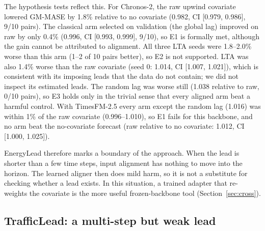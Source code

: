 \documentclass[preprint,11pt,authoryear]{elsarticle}
\newcommand{\lta}{\textsc{LTA}}
\begin{document}
The hypothesis tests reflect this. For Chronos-2, the raw upwind covariate lowered GM-MASE by 1.8\% relative to no covariate (0.982, CI [0.979, 0.986], 9/10 pairs). The classical arm selected on validation (the global lag) improved on raw by only 0.4\% (0.996, CI [0.993, 0.999], 9/10), so E1 is formally met, although the gain cannot be attributed to alignment. All three \lta{} seeds were 1.8--2.0\% worse than this arm (1--2 of 10 pairs better), so E2 is not supported. \lta{} was also 1.4\% worse than the raw covariate (seed 0: 1.014, CI [1.007, 1.021]), which is consistent with its imposing leads that the data do not contain; we did not inspect its estimated leads. The random lag was worse still (1.038 relative to raw, 0/10 pairs), so E3 holds only in the trivial sense that every aligned arm beat a harmful control. With TimesFM-2.5 every arm except the random lag (1.016) was within 1\% of the raw covariate (0.996--1.010), so E1 fails for this backbone, and no arm beat the no-covariate forecast (raw relative to no covariate: 1.012, CI [1.000, 1.025]).

EnergyLead therefore marks a boundary of the approach. When the lead is shorter than a few time steps, input alignment has nothing to move into the horizon. The learned aligner then does mild harm, so it is not a substitute for checking whether a lead exists. In this situation, a trained adapter that re-weights the covariate is the more useful frozen-backbone tool (Section~\ref{sec:cross}).



\subsection{TrafficLead: a multi-step but weak lead}
\label{sec:traffic}
\end{document}
